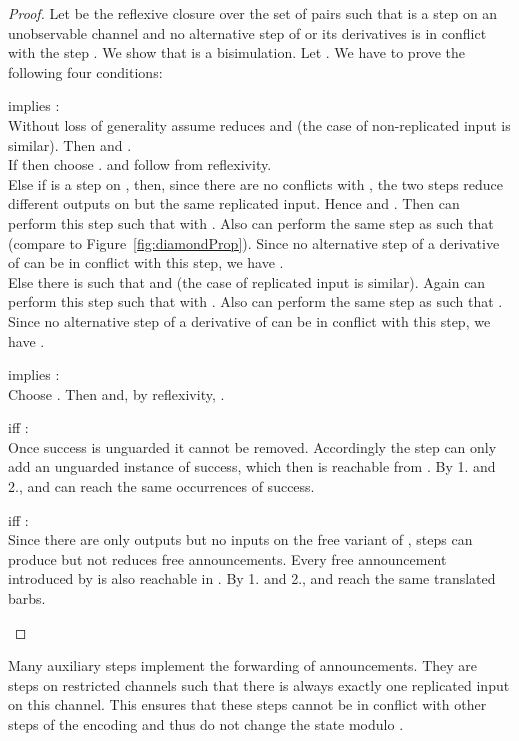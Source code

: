 \documentclass[]{eptcs}
\begin{document}
\begin{proof}
	Let  be the reflexive closure over the set of pairs  such that  is a step on an unobservable channel and no alternative step of  or its derivatives is in conflict with the step . We show that  is a bisimulation.
	Let .
	We have to prove the following four conditions:
	\begin{compactenum}
		\item  implies :\\
			Without loss of generality assume  reduces  and  (the case of non-replicated input is similar).
			Then  and .\\
			If  then choose .  and  follow from reflexivity.\\
			Else if  is a step on , then, since there are no conflicts with , the two steps reduce different outputs on  but the same replicated input. Hence  and . Then  can perform this step such that  with . Also  can perform the same step as  such that  (compare to Figure~\ref{fig:diamondProp}). Since no alternative step of a derivative of  can be in conflict with this step, we have .\\
			Else there is  such that  and  (the case of replicated input is similar). Again  can perform this step such that  with . Also  can perform the same step as  such that . Since no alternative step of a derivative of  can be in conflict with this step, we have .
		\item  implies :\\
			Choose . Then  and, by reflexivity, . 
		\item  iff :\\
			Once success is unguarded it cannot be removed. Accordingly the step can only add an unguarded instance of success, which then is reachable from . By 1. and 2.,  and  can reach the same occurrences of success.
		\item  iff :\\
			Since there are only outputs but no inputs on the free variant of , steps can produce but not reduces free announcements. Every free announcement introduced by  is also reachable in . By 1. and 2.,  and  reach the same translated barbs.
	\end{compactenum}
\end{proof}

Many auxiliary steps implement the forwarding of announcements. They are steps on restricted channels such that there is always exactly one replicated input on this channel. This ensures that these steps cannot be in conflict with other steps of the encoding and thus do not change the state modulo .
\end{document}
